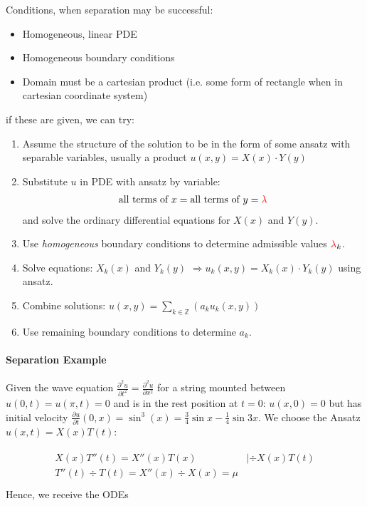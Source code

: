 \label{subsec:separation}
Conditions, when separation may be successful:

\begin{itemize}
    \item Homogeneous, linear PDE
    \item Homogeneous boundary conditions
    \item Domain must be a cartesian product (i.e. some form of rectangle when in cartesian coordinate system)
\end{itemize}

if these are given, we can try:

\begin{enumerate}
    \item Assume the structure of the solution to be in the form of some ansatz with separable variables, usually a product $u(x,y)=X(x)\cdot Y(y)$
    \item{
        Substitute $u$ in PDE with ansatz by variable:
        \begin{align*}
            \text{all terms of }x = \text{all terms of }y = {\color{red}\lambda}
        \end{align*}
        and solve the ordinary differential equations for $X(x)$ and $Y(y)$.
    }
    \item Use \emph{homogeneous} boundary conditions to determine admissible values ${\color{red}\lambda}_k$.
    \item Solve equations: $X_k(x)$ and $Y_k(y)$ $\Rightarrow u_k(x,y)=X_k(x)\cdot Y_k(y)$ using ansatz.
    \item Combine solutions: $u(x,y)=\sum_{k\in \mathbb{Z}}\left(a_ku_k(x,y)\right)$
    \item Use remaining boundary conditions to determine $a_k$.
\end{enumerate}

\paragraph{Separation Example}

Given the wave equation $\frac{\partial^2u}{\partial t^2}=\frac{\partial^2 u}{\partial x^2}$
for a string mounted between $u(0,t)=u(\pi,t)=0$ and is in the rest position at $t=0$: $u(x,0)=0$ but has initial velocity
$\frac{\partial u}{\partial t}(0,x)=\sin^3(x)=\frac{3}{4}\sin x-\frac{1}{4}\sin 3x$.
We choose the Ansatz $u(x,t)=X(x)T(t)$:

\begin{align*}
    \begin{matrix}
        X(x)T''(t)=X''(x)T(x) & |\div X(x)T(t) \\
        T''(t)\div T(t) = X''(x)\div X(x) = \mu
    \end{matrix} \\
\end{align*}
Hence, we receive the ODEs

